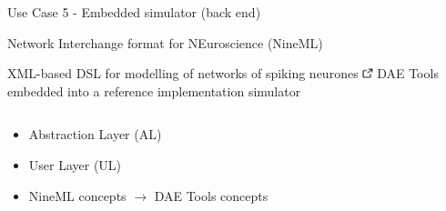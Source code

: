 \documentclass[compress,newPxFont,sthlmFooter]{beamer}
\begin{document}
\begin{frame}[plain]{Use Case 5 - Embedded simulator (back end)}
    \begin{center}
        \alert{Network Interchange format for NEuroscience (NineML)}
    \end{center}   
    \small{XML-based DSL for modelling of networks of spiking neurones 
                \href{http://software.incf.org/software/nineml}{\includegraphics[align=b, height=0.8em]{link.png}}
                } \linebreak
    \small{DAE Tools embedded into a \alert{reference implementation simulator}}
    \begin{columns}[c]
      \begin{column}{0.50\paperwidth}
        {\scriptsize
         \begin{itemize}
            \item \alert{Abstraction Layer (AL)}
            \item \alert{User Layer (UL)}
            \item NineML concepts $\rightarrow$ DAE Tools concepts
        \end{itemize}
        }
      \end{column}
      

\end{columns}
\end{frame}
\end{document}
